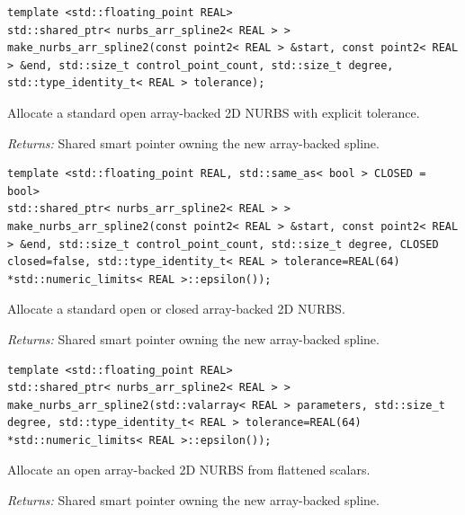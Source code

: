 \par\noindent\begin{minipage}{\linewidth}
\begin{lstlisting}[style=apireference]
template <std::floating_point REAL>
std::shared_ptr< nurbs_arr_spline2< REAL > > make_nurbs_arr_spline2(const point2< REAL > &start, const point2< REAL > &end, std::size_t control_point_count, std::size_t degree, std::type_identity_t< REAL > tolerance);
\end{lstlisting}
{\footnotesize Allocate a standard open array-backed 2D NURBS with explicit tolerance.\par}
{\footnotesize\textit{Returns:} Shared smart pointer owning the new array-backed spline.\par}
\end{minipage}\par\vspace{1pt}
\par\noindent\begin{minipage}{\linewidth}
\begin{lstlisting}[style=apireference]
template <std::floating_point REAL, std::same_as< bool > CLOSED = bool>
std::shared_ptr< nurbs_arr_spline2< REAL > > make_nurbs_arr_spline2(const point2< REAL > &start, const point2< REAL > &end, std::size_t control_point_count, std::size_t degree, CLOSED closed=false, std::type_identity_t< REAL > tolerance=REAL(64) *std::numeric_limits< REAL >::epsilon());
\end{lstlisting}
{\footnotesize Allocate a standard open or closed array-backed 2D NURBS.\par}
{\footnotesize\textit{Returns:} Shared smart pointer owning the new array-backed spline.\par}
\end{minipage}\par\vspace{1pt}
\par\noindent\begin{minipage}{\linewidth}
\begin{lstlisting}[style=apireference]
template <std::floating_point REAL>
std::shared_ptr< nurbs_arr_spline2< REAL > > make_nurbs_arr_spline2(std::valarray< REAL > parameters, std::size_t degree, std::type_identity_t< REAL > tolerance=REAL(64) *std::numeric_limits< REAL >::epsilon());
\end{lstlisting}
{\footnotesize Allocate an open array-backed 2D NURBS from flattened scalars.\par}
{\footnotesize\textit{Returns:} Shared smart pointer owning the new array-backed spline.\par}
\end{minipage}\par\vspace{1pt}
